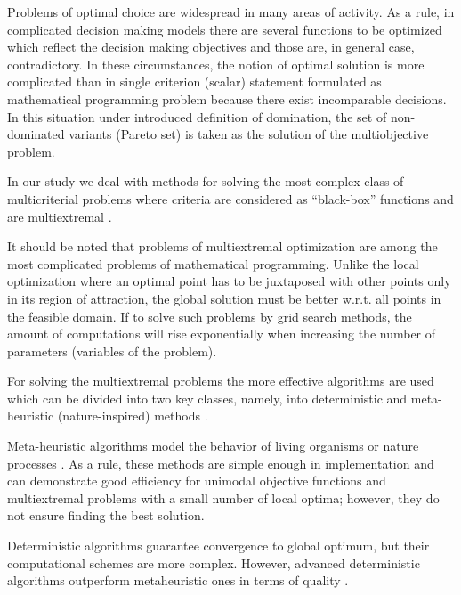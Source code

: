 \documentclass[runningheads]{llncs}
\begin{document}
\cite{Miettinen1999,Ehrgott2005,Pardalos2017,ML_MCO_2023,Evtushenko2014,Deb2002,Durillo2010,Mostaghim2007,NDG09,RC05,ZLT01,Gergel2019_2,Gergel2018,GergelKozinov2020,Marler2004,Strongin2000,Sergeyev2013,SVM_2000,PROB_2004,iOpt_url,Grishagin2015_2}

Problems of optimal choice are widespread in many areas of activity. As a rule, in complicated decision making models there are several functions to be optimized which reflect the decision making objectives and those are, in general case, contradictory. In these circumstances, the notion of optimal solution is more complicated than in single criterion (scalar) statement formulated as mathematical programming problem because there exist incomparable decisions. In this situation under introduced definition of domination, the set of non-dominated variants (Pareto set) is taken as the solution of the multiobjective problem.

In our study we deal with methods for solving the most complex class of multicriterial problems where criteria are considered as ``black-box'' functions and are multiextremal \cite{Miettinen1999,Ehrgott2005,Pardalos2017,Strongin2000,Sergeyev2013}.

It should be noted that problems of multiextremal optimization are among the most complicated problems of mathematical programming. Unlike the local optimization where an optimal point has to be juxtaposed with other points only in its region of attraction, the global solution must be better w.r.t. all points in the feasible domain. If to solve such problems by grid search methods, the amount of computations will rise exponentially when increasing the number of parameters (variables of the problem).

For solving the multiextremal problems the more effective algorithms are used which can be divided into two key classes, namely, into deterministic and meta-heuristic (nature-inspired) methods \cite{ML_MCO_2023,Evtushenko2014,Deb2002,Durillo2010,Mostaghim2007,NDG09,RC05,ZLT01,Gergel2018,GergelKozinov2020}. 

Meta-heuristic algorithms model the behavior of living organisms or nature processes \cite{Deb2002,Durillo2010,Mostaghim2007,NDG09,RC05,ZLT01}. As a rule, these methods are simple enough in implementation and can demonstrate good efficiency for unimodal objective functions and multiextremal problems with a small number of local optima; however, they do not ensure finding the best solution.

Deterministic algorithms guarantee convergence to global optimum, but their computational schemes are more complex. However, advanced deterministic algorithms outperform metaheuristic ones in terms of quality \cite{Kvasov2018,Sergeyev2018}.
\end{document}
